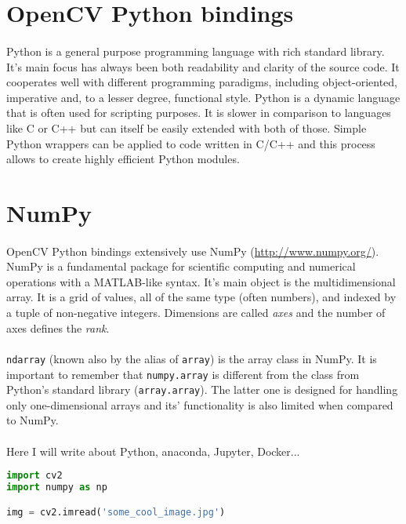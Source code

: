 \section{OpenCV Python bindings}
\paragraph{}
Python is a general purpose programming language with rich standard library. It's main focus has always been both readability and clarity of the source code. It cooperates well with different programming paradigms, including object-oriented, imperative and, to a lesser degree, functional style. Python is a dynamic language that is often used for scripting purposes. It is slower in comparison to languages like C or C++ but can itself be easily extended with both of those. Simple Python wrappers can be applied to code written in C/C++ and this process allows to create highly efficient Python modules.

\section{NumPy}
\paragraph{}
OpenCV Python bindings extensively use NumPy (\url{http://www.numpy.org/}). NumPy is a fundamental package for scientific computing and numerical operations with a MATLAB-like syntax. It's main object is the multidimensional array. It is a grid of values, all of the same type (often numbers), and indexed by a tuple of non-negative integers. Dimensions are called \textit{axes} and the number of axes defines the \textit{rank}.
\paragraph{}
\texttt{ndarray} (known also by the alias of \texttt{array}) is the array class in NumPy. It is important to remember that \texttt{numpy.array} is different from the class from Python's standard library (\texttt{array.array}). The latter one is designed for handling only one-dimensional arrays and its' functionality is also limited when compared to NumPy.

\paragraph{}
Here I will write about Python, anaconda, Jupyter, Docker...

\begin{lstlisting}[language=Python, caption=Python test code]
import cv2
import numpy as np

img = cv2.imread('some_cool_image.jpg')
\end{lstlisting}

